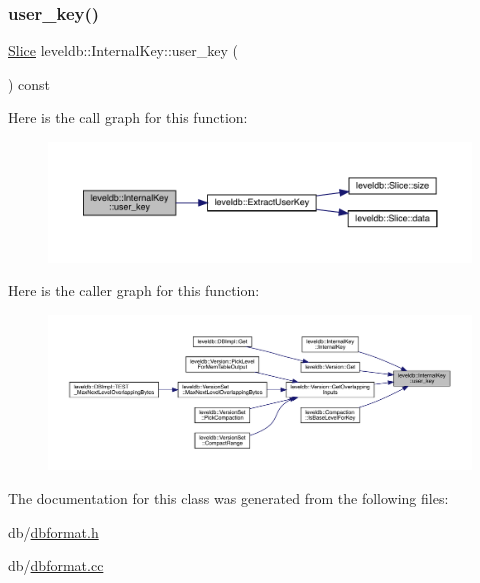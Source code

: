 \subsubsection{\texorpdfstring{user\_key()}{user\_key()}}
{\footnotesize\ttfamily \mbox{\hyperlink{classleveldb_1_1_slice}{Slice}} leveldb\+::\+Internal\+Key\+::user\+\_\+key (\begin{DoxyParamCaption}{ }\end{DoxyParamCaption}) const\hspace{0.3cm}{\ttfamily [inline]}}

Here is the call graph for this function\+:
\nopagebreak
\begin{figure}[H]
\begin{center}
\leavevmode
\includegraphics[width=350pt]{classleveldb_1_1_internal_key_a9673dbb181eaa977e6f09c45b02938bc_cgraph}
\end{center}
\end{figure}
Here is the caller graph for this function\+:
\nopagebreak
\begin{figure}[H]
\begin{center}
\leavevmode
\includegraphics[width=350pt]{classleveldb_1_1_internal_key_a9673dbb181eaa977e6f09c45b02938bc_icgraph}
\end{center}
\end{figure}


The documentation for this class was generated from the following files\+:\begin{DoxyCompactItemize}
\item 
db/\mbox{\hyperlink{dbformat_8h}{dbformat.\+h}}\item 
db/\mbox{\hyperlink{dbformat_8cc}{dbformat.\+cc}}\end{DoxyCompactItemize}
